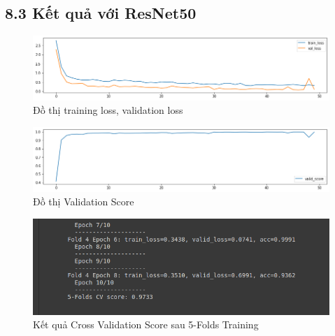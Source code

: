 \documentclass{article}
\begin{document}
	\subsection{8.3 Kết quả với ResNet50}
	\begin{figure}[H]
		\centering
		\includegraphics[width=1\linewidth]{results/resnet50/training_loss_results.png}
		\caption{Đồ thị training loss, validation loss}
		\label{fig:writing-thesis}
	\end{figure}
	\begin{figure}[H]
		\centering
		\includegraphics[width=1\linewidth]{results/resnet50/valid_score_results.png}
		\caption{Đồ thị Validation Score}
		\label{fig:writing-thesis}
	\end{figure}
	\begin{figure}[H]
		\centering
		\includegraphics[width=1\linewidth]{results/resnet50/CV_Score_5_Folds_ResNet50.png}
		\caption{Kết quả Cross Validation Score sau 5-Folds Training}
		\label{fig:writing-thesis}
	\end{figure}
\end{document}
